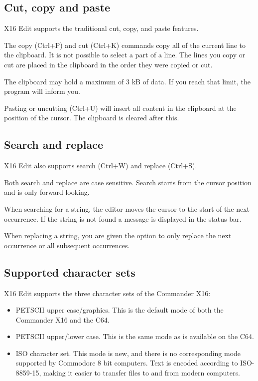 \documentclass{article}
\begin{document}
    \subsection{Cut, copy and paste}

        X16 Edit supports the traditional cut, copy, and paste features.

        The copy (Ctrl+P) and cut (Ctrl+K) commands copy all of the current line to the clipboard. It is not possible to select 
        a part of a line. The lines you copy or cut are placed in the clipboard in the order they were copied or cut.
        
        The clipboard may hold a maximum of 3 kB of data. If you reach that limit, the program will inform you.

        Pasting or uncutting (Ctrl+U) will insert all content in the clipboard at the position of the cursor. The clipboard
        is cleared after this.

    \subsection{Search and replace}

        X16 Edit also supports search (Ctrl+W) and replace (Ctrl+S).

        Both search and replace are case sensitive. Search starts from the
        cursor position and is only forward looking.

        When searching for a string, the editor moves the cursor to the start
        of the next occurrence. If the string is not found a message is
        displayed in the status bar.

        When replacing a string, you are given the option to only replace the
        next occurrence or all subsequent occurrences.

    \subsection{Supported character sets}

        X16 Edit supports the three character sets of the Commander X16:

        \begin{itemize}
            \item PETSCII upper case/graphics. This is the default mode of both the Commander X16 and the C64.

            \item PETSCII upper/lower case. This is the same mode as is available on the C64.

            \item ISO character set. This mode is new, and there is no corresponding mode supported by 
            Commodore 8 bit computers. Text is encoded according to ISO-8859-15, making it
            easier to transfer files to and from modern computers.
        \end{itemize}
\end{document}
